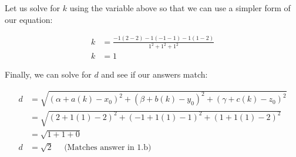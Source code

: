 \documentclass{article}
\begin{document}
\begin{text}
\indent Let us solve for $k$ using the variable above so that we can use a simpler form of our equation:
\end{text}

\begin{align*}
k &= \frac{-1(2-2) - 1(-1-1) - 1(1-2)}{1^2 + 1^2 + 1^2} \\
k &= 1
\end{align*}

\begin{text}
\indent Finally, we can solve for $d$ and see if our answers match:
\end{text}

\begin{align*}
d &= \sqrt{(\alpha + a(k) - x_0)^2 + (\beta + b(k) - y_0)^2 + (\gamma + c(k) - z_0)^2} \\
&= \sqrt{(2 + 1(1) - 2)^2 + (-1 + 1(1) - 1)^2 + (1 + 1(1) - 2)^2} \\
&= \sqrt{1 + 1 + 0} \\
d &= \sqrt{2} \quad \text{ (Matches answer in 1.b)}
\end{align*}
\end{document}
